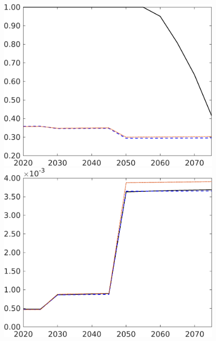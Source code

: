 \begin{figure}[h!!]
\begin{minipage}[]{0.32\textwidth}
	\end{minipage}
	\begin{minipage}[]{0.32\textwidth}
		\includegraphics[width=1\textwidth]{../../codding_model/own_basedOnFried/optimalPol_elastS_DisuSci/figures/all_1705/sn_CompEffOPT_T_NoTaus_spillover0_sep1_BN0_ineq0_etaa0.79_lgd0.png}
	\end{minipage}
	\begin{minipage}[]{0.32\textwidth}
		\includegraphics[width=1\textwidth]{../../codding_model/own_basedOnFried/optimalPol_elastS_DisuSci/figures/all_1705/Lg_CompEffOPT_T_NoTaus_spillover0_sep1_BN0_ineq0_etaa0.79_lgd0.png}

\end{minipage}
\end{figure}
